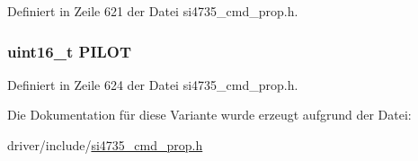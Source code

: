 Definiert in Zeile 621 der Datei si4735\+\_\+cmd\+\_\+prop.\+h.

\hypertarget{unionfm__rsq__blend__thres_acfac363989b431911806622060eda094}{}
\subsubsection[{P\+I\+L\+O\+T}]{\setlength{\rightskip}{0pt plus 5cm}uint16\+\_\+t P\+I\+L\+O\+T}\label{unionfm__rsq__blend__thres_acfac363989b431911806622060eda094}


Definiert in Zeile 624 der Datei si4735\+\_\+cmd\+\_\+prop.\+h.



Die Dokumentation für diese Variante wurde erzeugt aufgrund der Datei\+:\begin{DoxyCompactItemize}
\item 
driver/include/\hyperlink{si4735__cmd__prop_8h}{si4735\+\_\+cmd\+\_\+prop.\+h}\end{DoxyCompactItemize}
